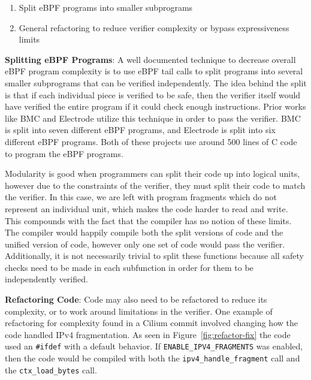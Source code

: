 \begin{enumerate}
    \item Split eBPF programs into smaller subprograms
    \item General refactoring to reduce verifier complexity or bypass expressiveness limits
\end{enumerate}

\noindent\textbf{Splitting eBPF Programs}:
A well documented technique to decrease overall eBPF program complexity is to use eBPF tail calls to split programs into several smaller subprograms that can be verified independently.
The idea behind the split is that if each individual piece is verified to be safe, then the verifier itself would have verified the entire program if it could check enough instructions.
Prior works like BMC\cite{BMC} and Electrode\cite{Electrode} utilize this technique in order to pass the verifier.
BMC is split into seven different eBPF programs, and Electrode is split into six different eBPF programs.
Both of these projects use around 500 lines of C code to program the eBPF programs.

Modularity is good when programmers can split their code up into logical units, however due to the constraints of the verifier, they must split their code to match the verifier.
In this case, we are left with program fragments which do not represent an individual unit, which makes the code harder to read and write.
This compounds with the fact that the compiler has no notion of these limits.
The compiler would happily compile both the split versions of code and the unified version of code, however only one set of code would pass the verifier.
Additionally, it is not necessarily trivial to split these functions because all safety checks need to be made in each subfunction in order for them to be independently verified.

\noindent\textbf{Refactoring Code}:
Code may also need to be refactored to reduce its complexity, or to work around limitations in the verifier.
One example of refactoring for complexity found in a Cilium commit involved changing how the code handled IPv4 fragmentation.
As seen in Figure~\ref{fig:refactor-fix} the code used an \texttt{\#ifdef} with a default behavior.
If \texttt{ENABLE\_IPV4\_FRAGMENTS} was enabled, then the code would be compiled with both the \texttt{ipv4\_handle\_fragment} call and the \texttt{ctx\_load\_bytes} call.

